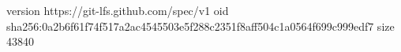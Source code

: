 version https://git-lfs.github.com/spec/v1
oid sha256:0a2b6f61f74f517a2ac4545503e5f288c2351f8aff504c1a0564f699c999edf7
size 43840
